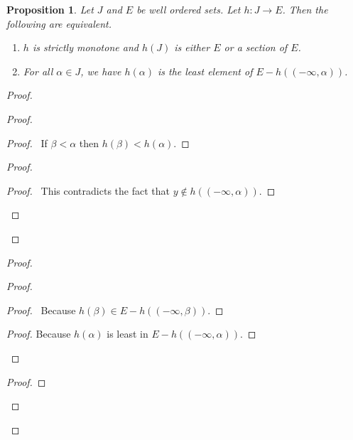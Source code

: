 \documentclass{book}
\newtheorem{prop}[ax]{Proposition}
\theoremstyle{definition}
\begin{document}
\begin{prop}
\label{prop:order_preserving_maps}
Let $J$ and $E$ be well ordered sets. Let $h : J \rightarrow E$. Then the following are equivalent.
\begin{enumerate}
\item $h$ is strictly monotone and $h(J)$ is either $E$ or a section of $E$.
\item For all $\alpha \in J$, we have $h(\alpha)$ is the least element of $E - h((-\infty, \alpha))$.
\end{enumerate}
\end{prop}

\begin{proof}
\pf
{}
\begin{proof}
	\begin{proof}
		\pf\ If $\beta < \alpha$ then $h(\beta) < h(\alpha)$.
	\end{proof}
	\begin{proof}
		\qedstep
		\begin{proof}
			\pf\ This contradicts the fact that $y \notin h((-\infty, \alpha))$.
		\end{proof}
	\end{proof}
\end{proof}
\begin{proof}
	\begin{proof}
		\begin{proof}
			\pf\ Because $h(\beta) \in E - h((-\infty, \beta))$.
		\end{proof}
		\begin{proof}
			\pf Because $h(\alpha)$ is least in $E - h((-\infty, \alpha))$.
		\end{proof}
	\end{proof}
	\begin{proof}

\end{proof}
\end{proof}
\end{proof}
\end{document}
